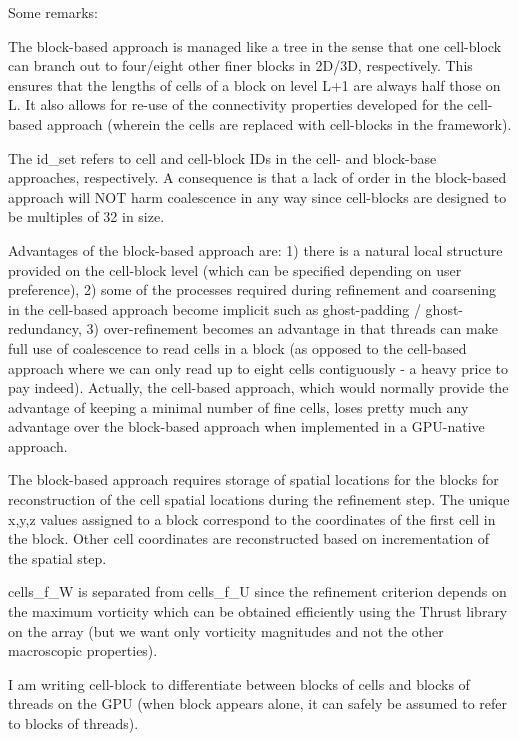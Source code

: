 Some remarks\+:
\begin{DoxyItemize}
\item The block-\/based approach is managed like a tree in the sense that one cell-\/block can branch out to four/eight other finer blocks in 2\+D/3D, respectively. This ensures that the lengths of cells of a block on level L+1 are always half those on L. It also allows for re-\/use of the connectivity properties developed for the cell-\/based approach (wherein the \textquotesingle{}cells\textquotesingle{} are replaced with cell-\/blocks in the framework).
\item The id\+\_\+set refers to cell and cell-\/block I\+Ds in the cell-\/ and block-\/base approaches, respectively. A consequence is that a lack of order in the block-\/based approach will N\+OT harm coalescence in any way since cell-\/blocks are designed to be multiples of 32 in size.
\item Advantages of the block-\/based approach are\+: 1) there is a natural local structure provided on the cell-\/block level (which can be specified depending on user preference), 2) some of the processes required during refinement and coarsening in the cell-\/based approach become implicit such as ghost-\/padding / ghost-\/redundancy, 3) over-\/refinement becomes an advantage in that threads can make full use of coalescence to read cells in a block (as opposed to the cell-\/based approach where we can only read up to eight cells contiguously -\/ a heavy price to pay indeed). Actually, the cell-\/based approach, which would normally provide the advantage of keeping a minimal number of fine cells, loses pretty much any advantage over the block-\/based approach when implemented in a G\+P\+U-\/native approach.
\item The block-\/based approach requires storage of spatial locations for the blocks for reconstruction of the cell spatial locations during the refinement step. The unique x,y,z values assigned to a block correspond to the coordinates of the first cell in the block. Other cell coordinates are reconstructed based on incrementation of the spatial step.
\item cells\+\_\+f\+\_\+W is separated from cells\+\_\+f\+\_\+U since the refinement criterion depends on the maximum vorticity which can be obtained efficiently using the Thrust library on the array (but we want only vorticity magnitudes and not the other macroscopic properties).
\item I am writing cell-\/block to differentiate between blocks of cells and blocks of threads on the G\+PU (when block appears alone, it can safely be assumed to refer to blocks of threads). 
\end{DoxyItemize}

